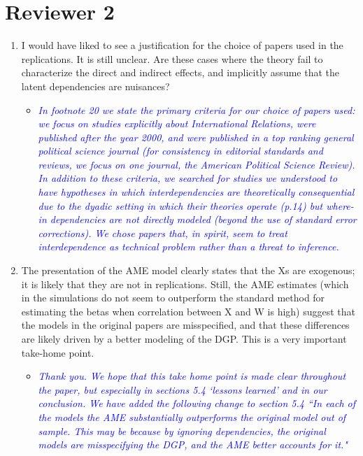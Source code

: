 \section*{Reviewer 2}

\begin{enumerate}
	\item I would have liked to see a justification for the choice of papers used in the replications. It is still unclear. Are these cases where the theory fail to characterize the direct and indirect effects, and implicitly assume that the latent dependencies are nuisances?
	\begin{itemize}
		\item \textcolor{blue}{ \emph{
		In footnote 20 we state the primary criteria for our choice of papers used: we focus on studies explicitly about International Relations, were published after the year 2000, and were published in a top ranking general political science journal (for consistency in editorial standards and reviews, we focus on one journal, the American Political Science Review). In addition to these criteria, we searched for studies we understood to have hypotheses in which interdependencies are theoretically consequential due to the dyadic setting in which their theories operate (p.14) but where-in dependencies are not directly modeled (beyond the use of standard error corrections). We chose papers that, in spirit, seem to treat interdependence as technical problem rather than a threat to inference.}}
	\end{itemize}
	\item The presentation of the AME model clearly states that the Xs are exogenous; it is likely that they are not in replications. Still, the AME estimates (which in the simulations do not seem to outperform the standard method for estimating the betas when correlation between X and W is high) suggest that the models in the original papers are misspecified, and that these differences are likely driven by a better modeling of the DGP. This is a very important take-home point.
	\begin{itemize}
		\item \textcolor{blue}{ \emph{
			Thank you. We hope that this take home point is made clear throughout the paper, but especially in sections 5.4 `lessons learned' and in our conclusion. We have added the following change to section 5.4 ``In each of the models the AME substantially outperforms the original model out of sample. This may be because by ignoring dependencies, the original models are misspecifying the DGP, and the AME better accounts for it."
			}}
	\end{itemize}
\end{enumerate}